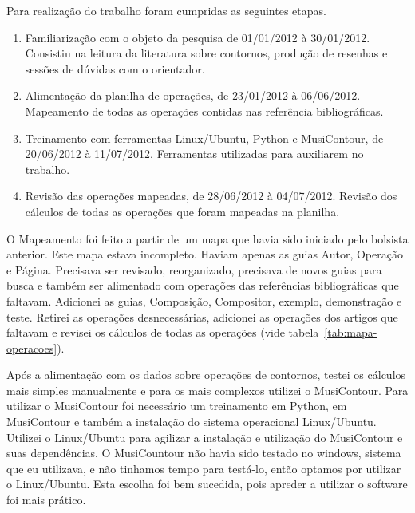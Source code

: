 \documentclass[11pt]{article}
\begin{document}
Para realização do trabalho foram cumpridas as seguintes etapas.

\begin{enumerate}
\item Familiarização com o objeto da pesquisa de 01/01/2012 à 30/01/2012.
Consistiu na leitura da literatura sobre contornos, produção de resenhas
e sessões de dúvidas com o orientador.
\item Alimentação da planilha de operações, de 23/01/2012 à 06/06/2012.
Mapeamento de todas as operações contidas nas referência
bibliográficas.
\item Treinamento com ferramentas Linux/Ubuntu, Python e MusiContour, de 20/06/2012 à 11/07/2012.
Ferramentas utilizadas para auxiliarem no trabalho.
\item Revisão das operações mapeadas, de 28/06/2012 à 04/07/2012.
Revisão dos cálculos de todas as operações que foram mapeadas na planilha.
\end{enumerate}

O Mapeamento foi feito a partir de um mapa que havia sido iniciado
pelo bolsista anterior. Este mapa estava incompleto. Haviam apenas
as guias Autor, Operação e Página. Precisava ser revisado, reorganizado, 
precisava de novos guias para busca e também ser alimentado com operações
das referências bibliográficas que faltavam. Adicionei as guias, Composição,
Compositor, exemplo, demonstração e teste. Retirei as operações desnecessárias,
adicionei as operações dos artigos que faltavam e revisei os cálculos de todas
as operações (vide tabela~\ref{tab:mapa-operacoes}).

Após a alimentação com os dados sobre operações de contornos, testei os 
cálculos mais simples manualmente e para os mais complexos utilizei o MusiContour. 
Para utilizar o MusiContour foi necessário um treinamento em Python,
em MusiContour e também a instalação do sistema operacional
Linux/Ubuntu.
Utilizei o Linux/Ubuntu para agilizar a instalação e utilização do 
MusiContour e suas dependências. O MusiCountour não
havia sido testado no windows, sistema que eu utilizava, e não
tinhamos tempo para testá-lo, então optamos por utilizar o
Linux/Ubuntu.
Esta escolha foi bem sucedida, pois apreder a utilizar o software
foi mais prático.
\end{document}
